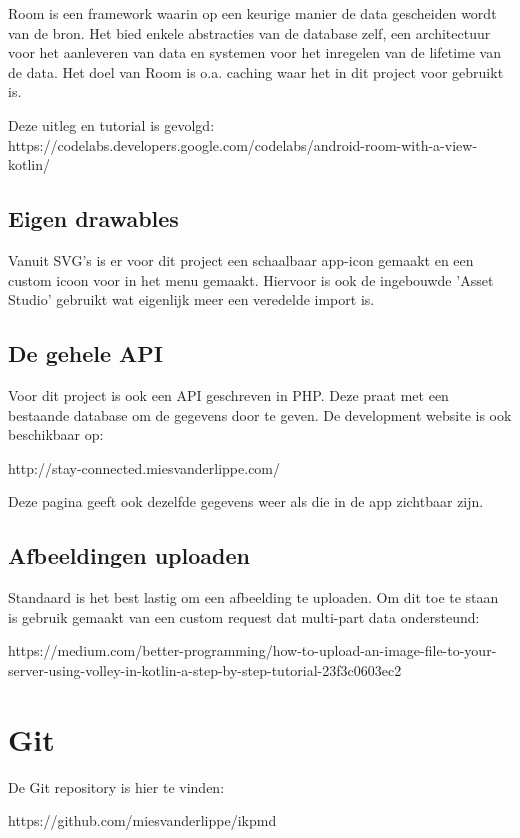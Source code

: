 \documentclass[dutch]{report}
\begin{document}
	Room is een framework waarin op een keurige manier de data gescheiden wordt van de bron. Het bied enkele 
	abstracties van de database zelf, een architectuur voor het aanleveren van data en systemen voor het 
	inregelen van de lifetime van de data. Het doel van Room is o.a. caching waar het in dit project voor gebruikt 
	is. 
	
	\vspace{1em}
	Deze uitleg en tutorial is gevolgd: https://codelabs.developers.google.com/codelabs/android-room-with-a-view-kotlin/
	
	\subsection{Eigen drawables}
	Vanuit SVG's is er voor dit project een schaalbaar app-icon gemaakt en een custom icoon voor in het menu gemaakt.
	Hiervoor is ook de ingebouwde 'Asset Studio' gebruikt wat eigenlijk meer een veredelde import is.
	
	\subsection{De gehele API}
	Voor dit project is ook een API geschreven in PHP. Deze praat met een bestaande database om de gegevens door te geven. 
	De development website is ook beschikbaar op: 
	
	http://stay-connected.miesvanderlippe.com/
	
	Deze pagina geeft ook dezelfde gegevens weer als die in de app zichtbaar zijn. 
	
	\subsection{Afbeeldingen uploaden}
	Standaard is het best lastig om een afbeelding te uploaden. Om dit toe te staan is gebruik gemaakt van een custom 
	request dat multi-part data ondersteund: 
	
	https://medium.com/better-programming/how-to-upload-an-image-file-to-your-server-using-volley-in-kotlin-a-step-by-step-tutorial-23f3c0603ec2
	
	
	\section{Git}
	De Git repository is hier te vinden: 
	
	https://github.com/miesvanderlippe/ikpmd
	
\end{document}

